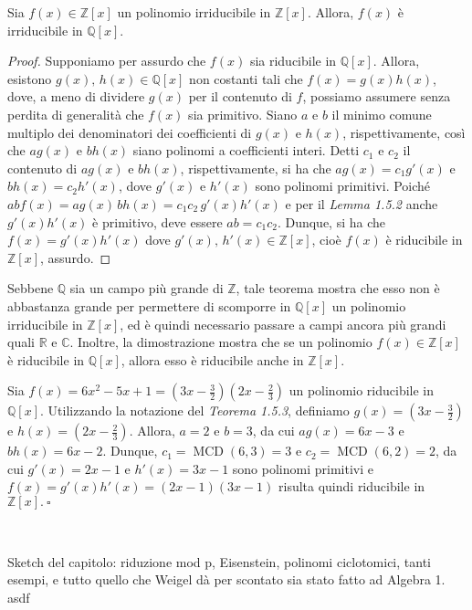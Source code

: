 \begin{teo}[1.5.3]{}
Sia $f(x)\in \mathbb{Z}[x]$ un polinomio irriducibile in $\mathbb{Z}[x]$. Allora, $f(x)$ è irriducibile in $\mathbb{Q}[x]$.
\end{teo}
\vspace{-4mm}
\begin{proof}
Supponiamo per assurdo che $f(x)$ sia riducibile in $\mathbb{Q}[x]$. Allora, esistono $g(x),\,h(x)\in \mathbb{Q}[x]$ non costanti tali che $f(x)=g(x)h(x)$, dove, a meno di dividere $g(x)$ per il contenuto di $f$, possiamo assumere senza perdita di generalità che $f(x)$ sia primitivo. Siano $a$ e $b$ il minimo comune multiplo dei denominatori dei coefficienti di $g(x)$ e $h(x)$, rispettivamente, così che $ag(x)$ e $bh(x)$ siano polinomi a coefficienti interi. Detti $c_1$ e $c_2$ il contenuto di $ag(x)$ e $bh(x)$, rispettivamente, si ha che $ag(x)=c_1 g'(x)$ e $bh(x)=c_2h'(x)$, dove $g'(x)$ e $h'(x)$ sono polinomi primitivi. Poiché $abf(x)=ag(x)\,bh(x)=c_1c_2\,g'(x)h'(x)$ e per il \emph{Lemma 1.5.2} anche $g'(x)h'(x)$ è primitivo, deve essere $ab=c_1c_2$. Dunque, si ha che $f(x)=g'(x)h'(x)$ dove $g'(x),\,h'(x)\in \mathbb{Z}[x]$, cioè $f(x)$ è riducibile in $\mathbb{Z}[x]$, assurdo.
\end{proof}

\noindent Sebbene $\mathbb{Q}$ sia un campo più grande di $\mathbb{Z}$, tale teorema mostra che esso non è abbastanza grande per permettere di scomporre in $\mathbb{Q}[x]$ un polinomio irriducibile in $\mathbb{Z}[x]$, ed è quindi necessario passare a campi ancora più grandi quali $\mathbb{R}$ e $\mathbb{C}$. Inoltre, la dimostrazione mostra che se un polinomio $f(x)\in \mathbb{Z}[x]$ è riducibile in $\mathbb{Q}[x]$, allora esso è riducibile anche in $\mathbb{Z}[x]$.

\begin{exm}Sia $f(x)=6x^2-5x+1=(3x-\frac{3}{2})(2x-\frac{2}{3})$ un polinomio riducibile in $\mathbb{Q}[x]$. Utilizzando la notazione del \emph{Teorema 1.5.3}, definiamo $g(x)=(3x-\frac{3}{2})$ e $h(x)=(2x-\frac{2}{3})$. Allora, $a=2$ e $b=3$, da cui $ag(x)=6x-3$ e $bh(x)=6x-2$. Dunque, $c_1=\operatorname{MCD}(6,3)=3$ e $c_2=\operatorname{MCD}(6,2)=2$, da cui $g'(x)=2x-1$ e $h'(x)=3x-1$ sono polinomi primitivi e $f(x)=g'(x)h'(x)=(2x-1)(3x-1)$ risulta quindi riducibile in $\mathbb{Z}[x]. \ \square$\end{exm}

\

\noindent Sketch del capitolo: riduzione mod p, Eisenstein, polinomi ciclotomici, tanti esempi, e tutto quello che Weigel dà per scontato sia stato fatto ad Algebra 1.
asdf
\clearpage